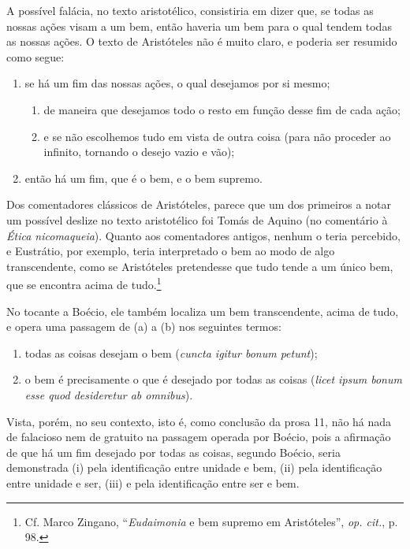 A possível falácia, no texto aristotélico, consistiria em dizer
que, se todas as nossas ações visam a um bem, então haveria um
bem para o qual tendem todas as nossas ações. O texto de
Aristóteles não é muito claro, e poderia ser resumido como
segue:

\begin{enumerate}
\item se há um fim das nossas ações, o qual desejamos por si
mesmo;

\begin{enumerate}
\item de maneira que desejamos todo o resto em função desse fim
de cada ação;

\item e se não escolhemos tudo em vista de outra coisa (para não
proceder ao infinito, tornando o desejo vazio e vão);
\end{enumerate}

\item então há um fim, que é o bem, e o bem supremo.
\end{enumerate}

Dos comentadores clássicos de Aristóteles, parece que um dos
primeiros a notar um possível deslize no texto aristotélico foi
Tomás de Aquino (no comentário à \emph{Ética nicomaqueia}).
Quanto aos comentadores antigos, nenhum o teria percebido, e
Eustrátio, por exemplo, teria interpretado o bem ao modo de algo
transcendente, como se Aristóteles pretendesse que tudo tende a
um único bem, que se encontra acima de tudo.\footnote{ Cf. Marco
Zingano, “\emph{Eudaimonia} e bem supremo em Aristóteles”, \emph{op.
cit.}, p. 98.}

No tocante a Boécio, ele também localiza um bem transcendente,
acima de tudo, e opera uma passagem de (a) a (b) nos seguintes
termos:

\begin{enumerate}
\item todas as coisas desejam o bem (\emph{cuncta igitur bonum
petunt});
\item o bem é precisamente o que é desejado por todas as coisas
(\emph{licet ipsum bonum esse quod desideretur ab omnibus}).
\end{enumerate}

Vista, porém, no seu contexto, isto é, como conclusão da prosa
11, não há nada de falacioso nem de gratuito na passagem operada
por Boécio, pois a afirmação de que há um fim desejado por todas
as coisas, segundo Boécio, seria demonstrada (i) pela
identificação entre unidade e bem, (ii) pela identificação entre
unidade e ser, (iii) e pela identificação entre ser e bem.

